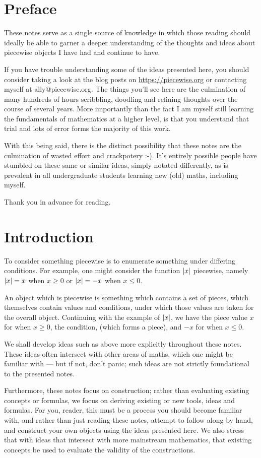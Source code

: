 \section*{Preface}
These notes serve as a single source of knowledge in which those reading should ideally be able to garner a deeper understanding of the thoughts and ideas about piecewise objects I have had and continue to have.

If you have trouble understanding some of the ideas presented here, you should consider taking a look at the blog posts on \url{https://piecewise.org} or contacting myself at ally@piecewise.org. The things you'll see here are the culmination of many hundreds of hours scribbling, doodling and refining thoughts over the course of several years. More importantly than the fact I am myself still learning the fundamentals of mathematics at a higher level, is that you understand that trial and lots of error forms the majority of this work.

With this being said, there is the distinct possibility that these notes are the culmination of wasted effort and crackpotery :-). It's entirely possible people have stumbled on these same or similar ideas, simply notated differently, as is prevalent in all undergraduate students learning new (old) maths, including myself.

Thank you in advance for reading.

\section{Introduction}
To consider something piecewise is to enumerate something under differing conditions. For example, one might consider the function $\abs{x}$ piecewise, namely $\abs{x}=x$ when $x\geq 0$ or $\abs{x}=-x$ when $x\leq 0$.

An object which is piecewise is something which contains a set of pieces, which themselves contain values and conditions, under which those values are taken for the overall object. Continuing with the example of $\abs{x}$, we have the piece value $x$ for when $x\geq 0$, the condition, (which forms a piece), and $-x$ for when $x\leq 0$.

We shall develop ideas such as above more explicitly throughout these notes. These ideas often intersect with other areas of maths, which one might be familiar with --- but if not, don't panic; such ideas are not strictly foundational to the presented notes.

Furthermore, these notes focus on construction; rather than evaluating existing concepts or formulas, we focus on deriving existing or new tools, ideas and formulas. For you, reader, this must be a process you should become familiar with, and rather than just reading these notes, attempt to follow along by hand, and construct your own objects using the ideas presented here. We also stress that with ideas that intersect with more mainstream mathematics, that existing concepts be used to evaluate the validity of the constructions.

